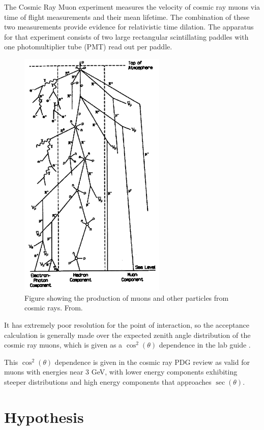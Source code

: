 The Cosmic Ray Muon experiment \cite{spatrick} measures the velocity of cosmic ray muons via time of flight measurements and their mean lifetime. The combination of these two measurements provide evidence for relativistic time dilation. The apparatus for that experiment consists of two large rectangular scintillating paddles with one photomultiplier tube (PMT) read out per paddle. 

\begin{figure}[htb]
\includegraphics[width=7cm]{muon_shower.png}
\caption{Figure showing the production of muons and other particles from cosmic rays. From\cite{grieder}.}
\label{fig:muon_shower}
\end{figure}

It has extremely poor resolution for the point of interaction, so the acceptance calculation is generally made over the expected zenith angle distribution of the cosmic ray muons, which is given as a $\cos^2(\theta)$ dependence in the lab guide \cite{spatrick}. 

This $\cos^2(\theta)$ dependence is given in the cosmic ray PDG review \cite{pdg} as valid for muons with energies near 3 GeV, with lower energy components exhibiting steeper distributions and high energy components that approaches $\sec(\theta)$.

\section{Hypothesis}


